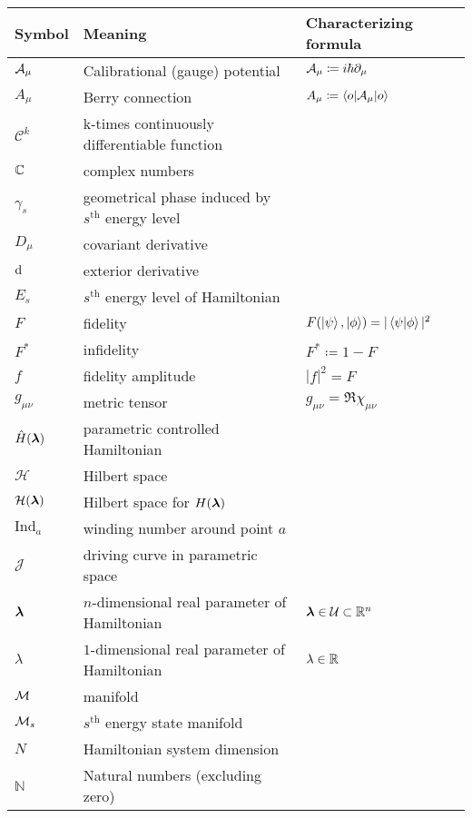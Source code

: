 

\begin{tabular} {@{}C{1.9cm}@{}p{8cm}@{}C{3.77cm}}
	\toprule
	\textbf{Symbol}& \textbf{Meaning}& \hspace{-30pt}\textbf{Characterizing formula}\\\bottomrule
	$\mathcal{A}_\mu$ & Calibrational (gauge) potential & $\mathcal{A}_\mu\coloneqq i\hbar \partial_\mu$ \\
	$A_\mu$ & Berry connection & $A_\mu\coloneqq \braket{o|\mathcal{A}_\mu|o}$ \\
	$\mathcal{C}^k$ & k-times continuously differentiable function \\
	$\mathbb{C}$ & complex numbers & \\
	  $\gamma_s$& geometrical phase induced by $s^{\text{th}}$ energy level &  \\
	  $D_\mu$&covariant derivative  &  \\
	  $\mathrm{d}$& exterior derivative  &  \\
	  $E_s$&$s^{\text{th}}$ energy level of Hamiltonian &  \\
	  $F$& fidelity & \hspace{-10pt}$F(\ket{\psi},\ket{\phi})=|\braket{\psi|\phi}|^2$  \\
	  $F^*$& infidelity & $F^*\coloneqq 1-F$  \\
	  $f$& fidelity amplitude  & $|f|^2=F$  \\
	  $g_{\mu\nu}$& metric tensor& $g_{\mu\nu}= \Re\chi_{\mu\nu}$ \\
	  $\hat{H}({\bm\lambda})$& parametric controlled Hamiltonian  &  \\ 
	  $\mathcal H$& Hilbert space  &  \\ 
	  $\mathcal H({\bm\lambda})$& Hilbert space for $H({\bm\lambda})$ &  \\ 
	  $\mathrm{Ind}_a$ & winding number around point $a$ & \\
	  $\mathcal J$ & driving curve in parametric space &  \\
	  ${\bm\lambda}$& $n$-dimensional real parameter of Hamiltonian &${\bm\lambda}\in \mathcal U\subset \mathbb{R}^n$  \\
	  $\lambda$&$1$-dimensional  real parameter of Hamiltonian &$\lambda\in \mathbb{R}$  \\
	  $\mathcal{M}$& manifold &  \\
	  $\mathcal{M}_s$& $s^{\text{th}}$ energy state manifold &  \\
	  $N$ & Hamiltonian system dimension & \\
	  $\mathbb{N}$ & Natural numbers (excluding zero) \\

\end{tabular}
